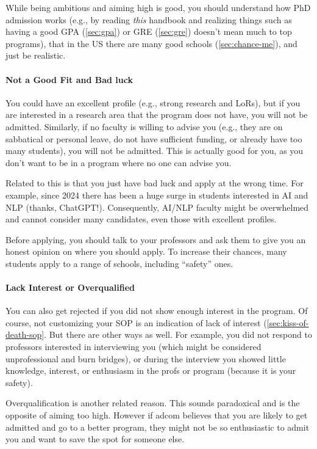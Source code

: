 \documentclass[oneside,11pt]{book}
\begin{document}
While being ambitious and aiming high is good, you should understand how PhD admission works (e.g., by reading \emph{this} handbook and realizing things such as having a good GPA (\autoref{sec:gpa}) or GRE (\autoref{sec:gre}) doesn't mean much to top programs), that in the US there are many good schools (\autoref{sec:chance-me}), and just be realistic. 

\paragraph{Not a Good Fit and Bad luck}  You could have an excellent profile (e.g., strong research and LoRs), but if you are interested in a research area that the program does not have, you will not be admitted.
Similarly, if no faculty is willing to advise you (e.g., they are on sabbatical or personal leave, do not have sufficient funding, or already have too many students), you will not be admitted.  This is actually good for you, as you don't want to be in a program where no one can advise you.

Related to this is that you just have bad luck and apply at the wrong time.  For example, since 2024 there has been a huge surge in students interested in AI and NLP (thanks, ChatGPT!). Consequently, AI/NLP faculty might be overwhelmed and cannot consider many candidates, even those with excellent profiles.



Before applying, you should talk to your professors and ask them to give you an honest opinion on where you should apply. To increase their chances, many students apply to a range of schools, including ``safety'' ones. 


\paragraph{Lack Interest or Overqualified} 

You can also get rejected if you did not show enough interest in the program. Of course, not customizing your SOP is an indication of lack of interest (\autoref{sec:kiss-of-death-sop}. But there are other ways as well. For example, you did not respond to professors interested in interviewing you (which might be considered unprofessional and burn bridges), or during the interview you showed little knowledge, interest, or enthusiasm in the profs or program (because it is your safety). 

Overqualification is another related reason.  This sounds paradoxical and is the opposite of aiming too high. However if adcom believes that you are likely to get admitted and go to a better program, they might not be so enthusiastic to admit you and want to save the spot for someone else.
\end{document}
